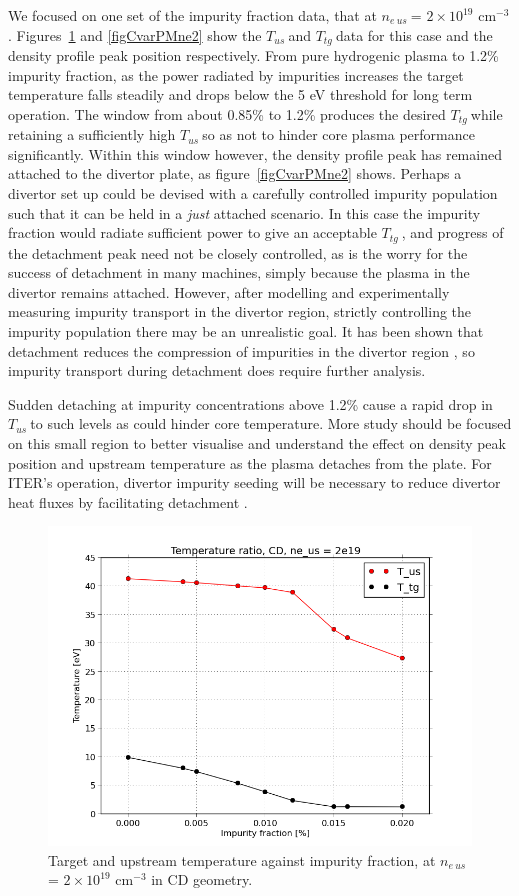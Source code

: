 \documentclass[12pt]{article}  %
\providecommand{\noNe}[1]{{${#1}\times 10^{19}$ cm$^{-3}$}} %
\providecommand{\neus}{$n_{e~us}~$} %
\providecommand{\Tus}{$T_{us}~$} %
\providecommand{\Ttg}{$T_{tg}~$} %
\begin{document}
We focused on one set of the impurity fraction data, that at \neus = \noNe{2}.  Figures~\ref{figCvarTRne2} and \ref{figCvarPMne2} show the \Tus and \Ttg data for this case and the density profile peak position respectively. From pure hydrogenic plasma to 1.2\% impurity fraction, as the power radiated by impurities increases the target temperature falls steadily and drops below the 5 eV threshold for long term operation. The window from about 0.85\% to 1.2\% produces the desired \Ttg while retaining a sufficiently high \Tus so as not to hinder core plasma performance significantly. Within this window however, the density profile peak has remained attached to the divertor plate, as figure~\ref{figCvarPMne2} shows. Perhaps a divertor set up could be devised with a carefully controlled impurity population such that it can be held in a \textit{just} attached scenario. In this case the impurity fraction would radiate sufficient power to give an acceptable \Ttg, and progress of the detachment peak need not be closely controlled, as is the worry for the success of detachment in many machines, simply because the plasma in the divertor remains attached. However, after modelling and experimentally measuring impurity transport in the divertor region, strictly controlling the impurity population there may be an unrealistic goal. It has been shown that detachment reduces the compression of impurities in the divertor region \cite{Bosch2001}, so impurity transport during detachment does require further analysis.

Sudden detaching at impurity concentrations above 1.2\% cause a rapid drop in \Tus to such levels as could hinder core temperature. More study should be focused on this small region to better visualise and understand the effect on density peak position and upstream temperature as the plasma detaches from the plate. For ITER's operation, divertor impurity seeding will be necessary to reduce divertor heat fluxes by facilitating detachment \cite{Kallenbach2013}.

\begin{figure}
	\includegraphics[scale=0.6]{Figures/sol1d/CvarTRne2.png}
	\centering
	\caption{Target and upstream temperature against impurity fraction, at \neus = \noNe{2} in CD geometry.}\label{figCvarTRne2}
\end{figure}
\end{document}
